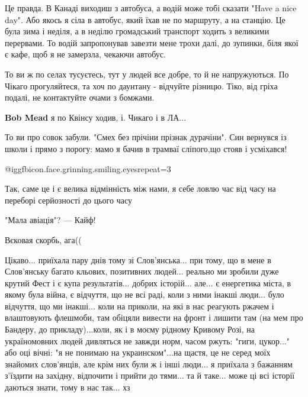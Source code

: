 \begin{itemize}

Це правда. В Канаді виходиш з автобуса, а водій може тобі сказати "Have a nice
day". Або якось я сіла в автобус, який їхав не по маршруту, а на станцію. Це
була зима і неділя, а в неділю громадський транспорт ходить з великими
перервами. То водій запропонував завезти мене трохи далі, до зупинки, біля якої
є кафе, щоб я не замерзла, чекаючи автобус.


То ви ж по селах тусуєтесь, тут у людей все добре, то й не напружуються. По
Чікаго прогуляйтеся, та хоч по даунтану - відчуйте різницю. Тіко, від гріха
подалі, не контактуйте очами з бомжами.

\begin{itemize} %
\textbf{Bob Mead} я по Квінсу ходив, і. Чикаго і в ЛА...
\end{itemize} %


То ви про совок забули. "Смех без прічіни прізнак дурачіни". Син вернувся із
школи і прямо з порогу: мамо я бачив в трамваї сліпого,що стояв і усміхався!


 @igg{fbicon.face.grinning.smiling.eyes}{repeat=3} 

Так, саме це і є велика відмінність між нами, я себе ловлю час від часу на переборі серйозності до цього часу

"Мала авіація"? — Кайф!

Вєковая скорбь, ага((


Цікаво... приїхала пару днів тому зі Слов'янська... при тому, що в мене в
Слов'янську багато кльових, позитивних людей... реально ми зробили дуже крутий
Фест і є купа результатів... добрих історій... але... є енергетика міста, в якому
була війна, є відчуття, що не всі раді, коли з ними інакші люди... було
відчуття, що ми інакші... коли на приколи, на які в нас реагують ржачем і
влаштовують флешмоби, там обіцяли вивести на фронт і лишити там (на мем про
Бандеру, до прикладу)...коли, як і в моєму рідному Кривому Розі, на
україномовних людей дивляться не завжди норм, часом ржуть: "гиги, цукор..." або
оці вічні: "я не понимаю на украинском"...на щастя, це не серед моїх знайомих
слов'янців, але крім них були ж і інші люди... я приїхала з бажанням з'їздити на
західну, відпочити і прийти до тями... та й таке... може ці всі історії даються
знати, тому в нас так... хз



\end{itemize}
